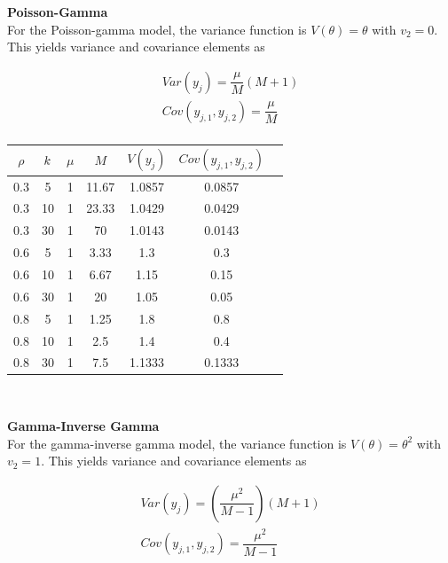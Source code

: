 \documentclass[12pt,epsfig]{article}
\newcommand{\changed}[1]{\textcolor{black}{#1}}
\newcommand{\testlength}{\changed{k}}%
\begin{document}
\noindent \textbf{Poisson-Gamma}\\

\noindent For the Poisson-gamma model, the variance function is $V(\theta) = \theta$ with $v_2 = 0$. This yields variance and covariance elements as

\begin{gather*}
Var(y_j) =  \dfrac{\mu}{M} (M + 1)\\
Cov(y_{j,1}, y_{j,2}) = \dfrac{\mu}{M}\\
\end{gather*}

\begin{centering}
\begin{tabular}{| c |  c | c | c  || c | c | c |} \hline
 $\rho$ & $\testlength$ & $\mu$ & $M$ & $V(y_j)$ & $Cov(y_{j,1}, y_{j,2})$ \\ \hline
 0.3 & 5 & 1 & 11.67 & 1.0857 & 0.0857 \\ 
 0.3 & 10 & 1 & 23.33 & 1.0429 & 0.0429 \\
 0.3 & 30 & 1 & 70 & 1.0143 & 0.0143 \\   
 0.6 & 5 & 1 & 3.33 & 1.3 & 0.3 \\        
 0.6 & 10 & 1 & 6.67 & 1.15 & 0.15 \\     
 0.6 & 30 & 1 & 20 & 1.05 & 0.05 \\       
 0.8 & 5 & 1 & 1.25 & 1.8 & 0.8 \\        
 0.8 & 10 & 1 & 2.5 & 1.4 & 0.4 \\        
 0.8 & 30 & 1 & 7.5 & 1.1333 & 0.1333 \\ \hline
    \end{tabular}\\
\end{centering}
\vspace{0.25in}

\noindent \textbf{Gamma-Inverse Gamma}\\

\noindent For the gamma-inverse gamma model, the variance function is $V(\theta) = \theta^2$ with $v_2 =1$. This yields variance and covariance elements as

\begin{gather*}
Var(y_j) =  \left(\dfrac{\mu^2}{M-1}\right) (M + 1)\\
Cov(y_{j,1}, y_{j,2}) = \dfrac{\mu^2}{M-1}\\
\end{gather*}
\end{document}
